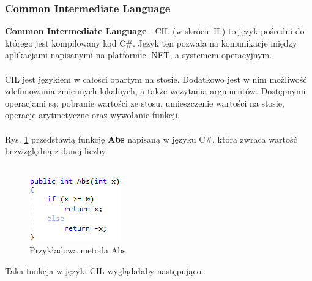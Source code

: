 \documentclass[12pt]{article}
\begin{document}
\subsubsection{Common Intermediate Language}
\textbf{Common Intermediate Language} - CIL (w skrócie IL) to język pośredni do którego jest kompilowany kod C\#. Język ten pozwala na komunikację między aplikacjami napisanymi na platformie .NET, a systemem operacyjnym.\\
\\
CIL jest językiem w całości opartym na stosie. Dodatkowo jest w nim możliwość zdefiniowania zmiennych lokalnych, a także wczytania argumentów. Dostępnymi operacjami są: pobranie wartości ze stosu, umieszczenie wartości na stosie, operacje arytmetyczne oraz wywołanie funkcji.\\
\\
Rys. \ref{fig:Example_Abs} przedstawią funkcję \textbf{Abs} napisaną w języku C\#, która zwraca wartość bezwzględną z danej liczby.\\ \\
\begin{figure}[H]
	\begin{center}
  		\includegraphics{Example_Abs.png}
  		\caption{Przykładowa metoda Abs}
  		\label{fig:Example_Abs}
	\end{center}
\end{figure}
Taka funkcja w języki CIL wyglądałaby następująco:\\ \\
\end{document}
